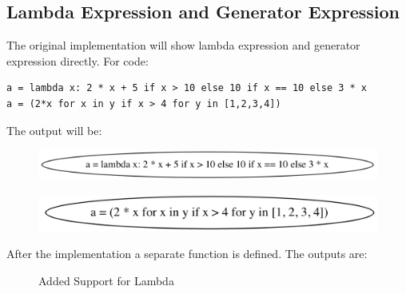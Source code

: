 \documentclass[11pt]{article}
\begin{document}
\subsection{Lambda Expression and Generator Expression}
The original implementation will show lambda expression and generator expression directly. For code:
\begin{lstlisting}
a = lambda x: 2 * x + 5 if x > 10 else 10 if x == 10 else 3 * x
a = (2*x for x in y if x > 4 for y in [1,2,3,4])
\end{lstlisting}
The output will be:
\begin{figure}[H]
  \centering
  \includegraphics[width=.85\textwidth]{img/lambdaexp_before.png}
\end{figure}
\vspace*{-.8cm}
\begin{figure}[H]
  \centering
  \includegraphics[width=.85\textwidth]{img/genexp_before.png}
\end{figure}
\noindent
After the implementation a separate function is defined. The outputs are:

\begin{figure}[H]
\centering
{}\hfill
{}\hfill
\caption{Added Support for Lambda} \label{fig:lambdaexp}
\end{figure}
\end{document}
